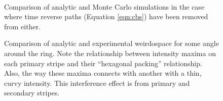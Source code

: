 \begin{figure}
\begin{center}
    \\
  \end{center}
  \caption{Comparison of analytic and Monte Carlo simulations in the case
    where time reverse paths (Equation \ref{eqn:cbs}) have been removed from
    either.}
  \label{fig:rtr}
\end{figure}

\begin{figure}
  \centering
  \caption{Comparison of analytic and experimental weirdospace for some angle
    around the ring.  Note the relationship between intensity maxima on each
    primary stripe and their ``hexagonal packing'' relationship.  Also, the way
    these maxima connects with another with a thin, curvy intensity.  This
    interference effect is from primary and secondary stripes.}
  \label{fig:hexagonalpacking1}
\end{figure}

